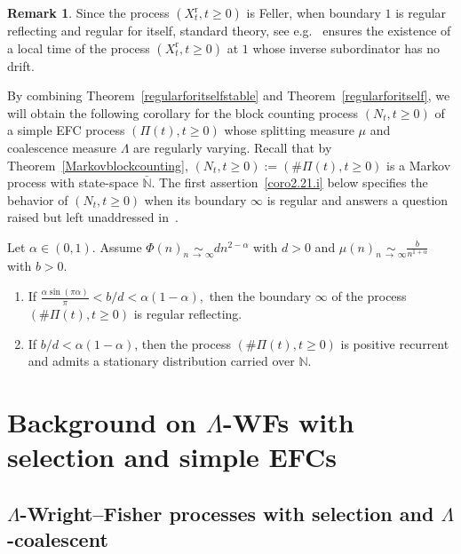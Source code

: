 \documentclass[10pt]{amsart}
\theoremstyle{definition}\newtheorem{defi}[theo]{Definition}\newtheorem{rema}[theo]{Remark}\newtheorem{exam}[theo]{Example}\newtheorem{exem}[theo]{Example}\newtheorem{nota}[theo]{Notation}
\newcommand{\rmr}{\mathrm{r}}
\newcommand{\bbN}{\mathbb{N}}
\newcommand*{\romanenumi}{\renewcommand*{\theenumi}{\roman{enumi}}}
\begin{document}
\begin{rema}
Since the process $(X_t^{\rmr},t\geq 0)$ is Feller, when boundary $1$ is regular reflecting and regular for itself, standard theory, see e.g.~\cite[Chapter~IV]{Bertoin96} ensures the existence of a local time of the process $(X_t^{\rmr},t\geq 0)$ at $1$ whose inverse subordinator has no drift.
\end{rema}

By combining Theorem~\ref{regularforitselfstable} and Theorem~\ref{regularforitself}, we will obtain the following corollary for the block counting process $(N_t,t\geq 0)$ of a simple EFC process $(\Pi(t),t\geq 0)$ whose splitting measure $\mu$ and coalescence measure $\Lambda$ are regularly varying. Recall that by Theorem~\ref{Markovblockcounting}, $(N_t,t\geq 0):=(\#\Pi(t),t\geq 0)$ is a Markov process with state-space $\bar{\bbN}$. The first assertion~\eqref{coro2.21.i} below specifies the behavior of $(N_t,t\geq 0)$ when its boundary $\infty$ is regular and answers a question raised but left unaddressed in~\cite{explosion}.

\begin{coro}\label{inftyregularreflecting}
Let $\alpha\in (0,1)$. Assume $\Phi(n)\underset{n\,\rightarrow\,\infty}{\sim} dn^{2-\alpha}$ with $d>0$ and $\mu(n)\underset{n\,\rightarrow\,\infty}{\sim} \frac{b}{n^{1+\alpha}}$ with $b>0$.
\begin{enumerate}\romanenumi
\item\label{coro2.21.i} If $\frac{\alpha \sin(\pi \alpha)}{\pi}<b/d<\alpha(1-\alpha),$ then the boundary $\infty$ of the process $(\#\Pi(t),t\geq 0)$ is regular reflecting.
\item\label{coro2.21.ii} If $b/d<\alpha(1-\alpha)$, then the process $(\#\Pi(t),t\geq 0)$ is positive recurrent and admits a stationary distribution carried over $\bbN$.
\end{enumerate}
\end{coro}



\section{Background on \texorpdfstring{$\Lambda$}{Lambda}-WFs with selection and simple EFCs}\label{background}

\subsection{\texorpdfstring{$\Lambda$}{Lambda}-Wright--Fisher processes with selection and \texorpdfstring{$\Lambda$}{Lambda}-coalescent}\label{backgroundWF}
\end{document}
